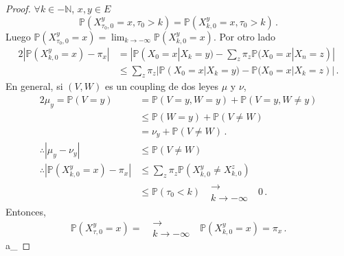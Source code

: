 \documentclass[letterpaper,11pt]{article} %
\theoremstyle{defbreak}
\theoremstyle{propbreak}
\theoremstyle{remark}
\theoremstyle{break}
\def\P{\mathbb{P}}
\def\N{\mathbb{N}}
\def\gris{\color{mygray}}
\def\negro{\color{black}}
\def\findem{\null\hfill\color{white}a\color{black}_\square}
\begin{document}
\begin{proof}  %
\gris
$\forall k\in -\N$, $x,y\in E$
$$ \P(X^y_{\tau_0,0}=x,\tau_0>k) = \P(X^y_{k,0}=x,\tau_0>k) \,.$$
Luego $\P(X^y_{\tau_0,0}=x)=\displaystyle\lim_{k\to-\infty}\P(X^y_{k,0}=x)$. Por otro lado
\begin{alignat*}{2}
    |\P(X^y_{k,0}=x)-\pi_x| & = |\P(X_0=x|X_k=y)-\displaystyle\sum_z\pi_z\P(X_0=x|X_n=z)| \\
     & \leq \sum_{z}\pi_z|\P(X_0=x|X_k=y)-\P(X_0=x|X_k=z)|\,.
\end{alignat*}
En general, si $(V,W)$ es un coupling de dos leyes $\mu$ y $\nu$,
\begin{alignat*}{2}
\mu_y = \P(V=y) & = \P(V=y,W=y)+\P(V=y,W\neq y) \\
 & \leq \P(W=y)+\P(V\neq W) \\
 & = \nu_y + \P(V\neq W)\,. \\
 \therefore |\mu_y-\nu_y| & \leq \P(V\neq W) \\
 \therefore |\P(X^y_{k,0}=x)-\pi_x| & \leq \displaystyle\sum_z\pi_z\P(X^y_{k,0} \neq X^z_{k,0}) \\
 & \leq \P(\tau_0<k) \mbox{ }\substack{\longrightarrow \\ k\to-\infty}\mbox{ }0\, .
\end{alignat*}
Entonces,
$$ \P(X^y_{\tau,0}=x)=\mbox{ }\substack{\longrightarrow \\ k\to-\infty}\mbox{ }\P(X^y_{k,0}=x)=\pi_x \, .$$
\findem
\negro
\end{proof}
\vspace{.5cm}\\
\end{document}
